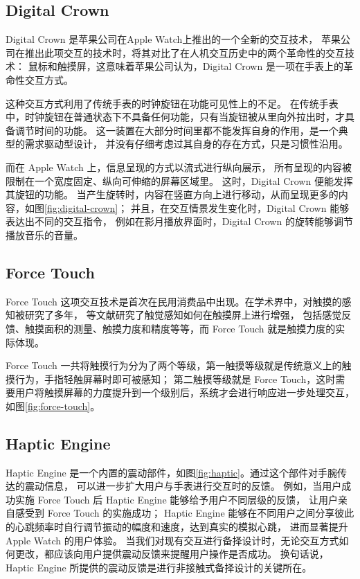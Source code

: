 \subsection{Digital Crown}

Digital Crown 是苹果公司在Apple Watch上推出的一个全新的交互技术，
苹果公司在推出此项交互的技术时，将其对比了在人机交互历史中的两个革命性的交互技术：
鼠标和触摸屏，这意味着苹果公司认为，Digital Crown 是一项在手表上的革命性交互方式。

这种交互方式利用了传统手表的时钟旋钮在功能可见性上的不足。
在传统手表中，时钟旋钮在普通状态下不具备任何功能，只有当旋钮被从里向外拉出时，才具备调节时间的功能。
这一装置在大部分时间里都不能发挥自身的作用，是一个典型的需求驱动型设计，
并没有仔细考虑过其自身的存在方式，只是习惯性沿用。

而在 Apple Watch 上，信息呈现的方式以流式进行纵向展示，
所有呈现的内容被限制在一个宽度固定、纵向可伸缩的屏幕区域里。
这时，Digital Crown 便能发挥其旋钮的功能。
当产生旋转时，内容在竖直方向上进行移动，从而呈现更多的内容，如图\ref{fig:digital-crown}；
并且，在交互情景发生变化时，Digital Crown 能够表达出不同的交互指令，
例如在影月播放界面时，Digital Crown 的旋转能够调节播放音乐的音量。

\subsection{Force Touch}

Force Touch 这项交互技术是首次在民用消费品中出现。在学术界中，对触摸的感知被研究了多年，
\cite{Boring:2012ea,Buschek:2015cd,Vogel:2007:STO:1240624.1240727}等文献研究了触觉感知如何在触摸屏上进行增强，
包括感觉反馈、触摸面积的测量、触摸力度和精度等等，而 Force Touch 就是触摸力度的实际体现。

Force Touch 一共将触摸行为分为了两个等级，第一触摸等级就是传统意义上的触摸行为，手指轻触屏幕时即可被感知；
第二触摸等级就是 Force Touch，这时需要用户将触摸屏幕的力度提升到一个级别后，系统才会进行响应进一步处理交互，
如图\ref{fig:force-touch}。

\subsection{Haptic Engine}

Haptic Engine 是一个内置的震动部件，如图\ref{fig:haptic}。通过这个部件对手腕传达的震动信息，
可以进一步扩大用户与手表进行交互时的反馈。
例如，当用户成功实施 Force Touch 后 Haptic Engine 能够给予用户不同层级的反馈，
让用户亲自感受到 Force Touch 的实施成功；
Haptic Engine 能够在不同用户之间分享彼此的心跳频率时自行调节振动的幅度和速度，达到真实的模拟心跳，
进而显著提升 Apple Watch 的用户体验。
当我们对现有交互进行备择设计时，无论交互方式如何更改，都应该向用户提供震动反馈来提醒用户操作是否成功。
换句话说，Haptic Engine 所提供的震动反馈是进行非接触式备择设计的关键所在。


